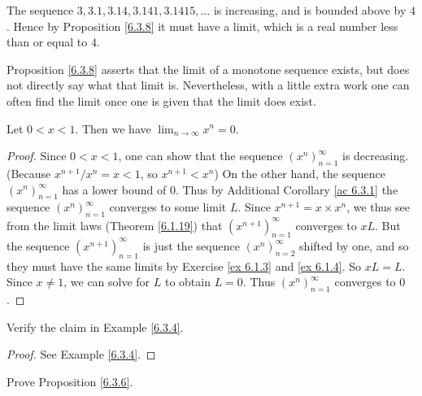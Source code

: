 \begin{example}\label{6.3.9}
The sequence \(3, 3.1, 3.14, 3.141, 3.1415, \dots\) is increasing, and is bounded above by \(4\).
Hence by Proposition \ref{6.3.8} it must have a limit, which is a real number less than or equal to \(4\).
\end{example}

\begin{note}
Proposition \ref{6.3.8} asserts that the limit of a monotone sequence exists, but does not directly say what that limit is.
Nevertheless, with a little extra work one can often find the limit once one is given that the limit does exist.
\end{note}

\begin{proposition}\label{6.3.10}
Let \(0 < x < 1\).
Then we have \(\lim_{n \to \infty} x^n = 0\).
\end{proposition}

\begin{proof}
Since \(0 < x < 1\), one can show that the sequence \((x^n)_{n = 1}^\infty\) is decreasing.
(Because \(x^{n + 1} / x^n = x < 1\), so \(x^{n + 1} < x^n\))
On the other hand, the sequence \((x^n)_{n = 1}^\infty\) has a lower bound of \(0\).
Thus by Additional Corollary \ref{ac 6.3.1} the sequence \((x^n)_{n = 1}^\infty\) converges to some limit \(L\).
Since \(x^{n + 1} = x \times x^n\), we thus see from the limit laws (Theorem \ref{6.1.19}) that \((x^{n + 1})_{n = 1}^\infty\) converges to \(xL\).
But the sequence \((x^{n + 1})_{n = 1}^\infty\) is just the sequence \((x^n)_{n = 2}^\infty\) shifted by one, and so they must have the same limits by Exercise \ref{ex 6.1.3} and \ref{ex 6.1.4}.
So \(xL = L\).
Since \(x \neq 1\), we can solve for \(L\) to obtain \(L = 0\).
Thus \((x^n)_{n = 1}^\infty\) converges to \(0\).
\end{proof}

\exercisesection

\begin{exercise}\label{ex 6.3.1}
Verify the claim in Example \ref{6.3.4}.
\end{exercise}

\begin{proof}
See Example \ref{6.3.4}.
\end{proof}

\begin{exercise}\label{ex 6.3.2}
Prove Proposition \ref{6.3.6}.
\end{exercise}

